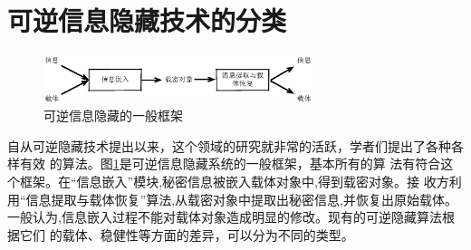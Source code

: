 \section{可逆信息隐藏技术的分类}
\label{s:type_application_reversible_data_hiding}
\begin{figure}[!ht]
\centering 
\includegraphics[width=0.7\textwidth]{figures/reversible_framework.eps}
\caption{可逆信息隐藏的一般框架}
\label{fig:revers_framework}
\end{figure}
自从可逆隐藏技术提出以来，这个领域的研究就非常的活跃，学者们提出了各种各样有效
的算法。图\ref{fig:revers_framework}是可逆信息隐藏系统的一般框架，基本所有的算
法有符合这个框架。在``信息嵌入''模块,秘密信息被嵌入载体对象中,得到载密对象。接
收方利用``信息提取与载体恢复''算法,从载密对象中提取出秘密信息,并恢复出原始载体。
一般认为,信息嵌入过程不能对载体对象造成明显的修改。现有的可逆隐藏算法根据它们
的载体、稳健性等方面的差异，可以分为不同的类型。\\
\vspace{-8mm}

